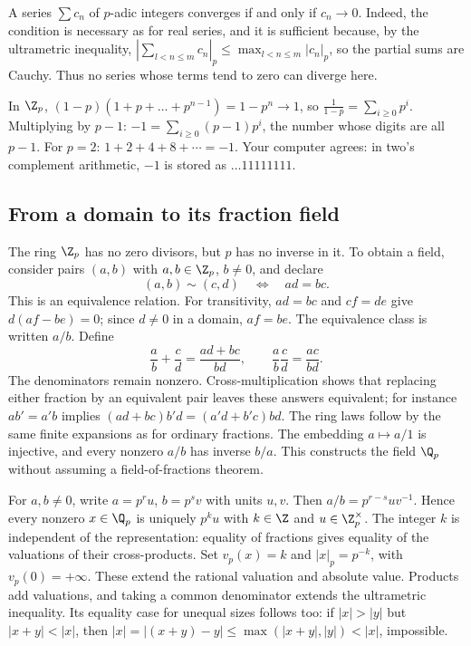 A series $\sum c_n$ of $p$-adic integers converges if and only if $c_n\to0$. Indeed, the condition is necessary as for real series, and it is sufficient because, by the ultrametric inequality, $\left|\sum_{l<n\le m}c_n\right|_p\le\max_{l<n\le m}|c_n|_p$, so the partial sums are Cauchy. Thus no series whose terms tend to zero can diverge here.

\begin{example}
In $\Z_p$, $(1-p)(1+p+\dots+p^{n-1})=1-p^n\to1$, so $\displaystyle\frac1{1-p}=\sum_{i\ge0}p^i$. Multiplying by $p-1$: $-1=\sum_{i\ge0}(p-1)p^i$, the number whose digits are all $p-1$. For $p=2$: $1+2+4+8+\cdots=-1$. Your computer agrees: in two's complement arithmetic, $-1$ is stored as $\dots11111111$.
\end{example}

\subsection*{From a domain to its fraction field}

The ring $\Z_p$ has no zero divisors, but $p$ has no inverse in it.
To obtain a field, consider pairs $(a,b)$ with $a,b\in\Z_p$, $b\ne0$,
and declare
\[
(a,b)\sim(c,d)\quad\Longleftrightarrow\quad ad=bc.
\]
This is an equivalence relation. For transitivity, $ad=bc$ and $cf=de$
give $d(af-be)=0$; since $d\ne0$ in a domain, $af=be$.
The equivalence class is written $a/b$. Define
\[
\frac ab+\frac cd=\frac{ad+bc}{bd},\qquad
\frac ab\frac cd=\frac{ac}{bd}.
\]
The denominators remain nonzero. Cross-multiplication shows that replacing
either fraction by an equivalent pair leaves these answers equivalent;
for instance $ab'=a'b$ implies
$(ad+bc)b'd=(a'd+b'c)bd$.
The ring laws follow by the same finite expansions as for ordinary fractions.
The embedding $a\mapsto a/1$ is injective, and every nonzero $a/b$
has inverse $b/a$. This constructs the field $\Q_p$ without assuming
a field-of-fractions theorem.

For $a,b\ne0$, write $a=p^ru$, $b=p^sv$ with units $u,v$.
Then $a/b=p^{r-s}uv^{-1}$. Hence every nonzero $x\in\Q_p$ is uniquely
$p^ku$ with $k\in\Z$ and $u\in\Z_p^\times$.
The integer $k$ is independent of the representation: equality of fractions
gives equality of the valuations of their cross-products.
Set $v_p(x)=k$ and $|x|_p=p^{-k}$, with $v_p(0)=+\infty$.
These extend the rational valuation and absolute value.
Products add valuations, and taking a common denominator extends the
ultrametric inequality. Its equality case for unequal sizes follows too:
if $|x|>|y|$ but $|x+y|<|x|$, then
$|x|=|(x+y)-y|\le\max(|x+y|,|y|)<|x|$, impossible.

